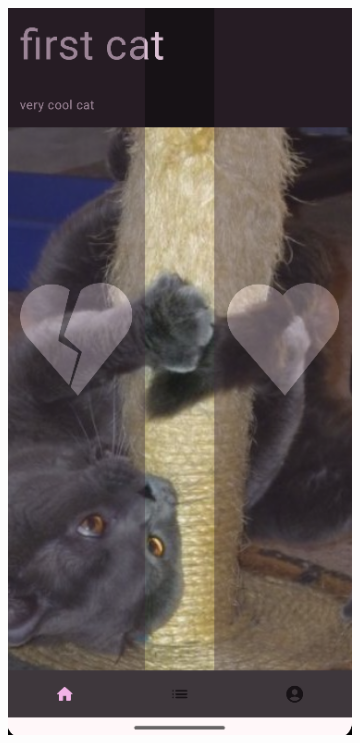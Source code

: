\documentclass{report}
\begin{document}
\begin{figure}[h]

    \centering
    \begin{subfigure}[b]{0.32\textwidth}
        \includegraphics[width=\textwidth]{DEMO_Main1.png} 

\end{subfigure}
\end{figure}
\end{document}
